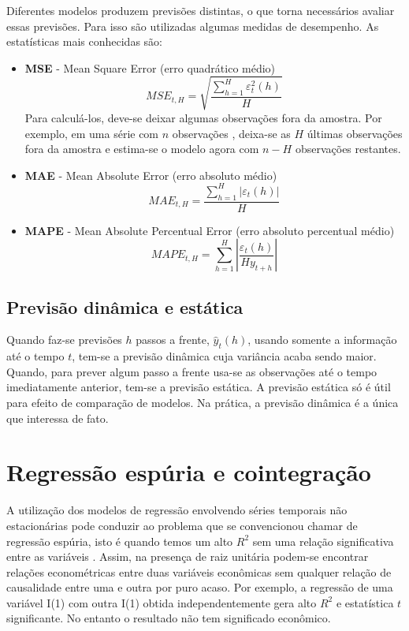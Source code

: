 \documentclass[
]{book}
\theoremstyle{definition}
\theoremstyle{definition}
\theoremstyle{definition}
\theoremstyle{remark}
\begin{document}
Diferentes modelos produzem previsões distintas, o que torna necessários avaliar essas previsões. Para isso são utilizadas algumas medidas de desempenho. As estatísticas mais conhecidas são:

\begin{itemize}
\item
  \textbf{MSE} - Mean Square Error (erro quadrático médio)
  \[MSE_{t,H}=\sqrt{\frac{\sum_{h=1}^{H}\varepsilon^2_t(h)}{H}}\]
  Para calculá-los, deve-se deixar algumas observações fora da amostra. Por exemplo, em uma série com \(n\) observações , deixa-se as \(H\) últimas observações fora da amostra e estima-se o modelo agora com \(n-H\) observações restantes.
\item
  \textbf{MAE} - Mean Absolute Error (erro absoluto médio)
  \[MAE_{t,H}=\frac{\sum_{h=1}^{H}|\varepsilon_t(h)|}{H}\]
\item
  \textbf{MAPE} - Mean Absolute Percentual Error (erro absoluto percentual médio)
  \[MAPE_{t,H}=\sum_{h=1}^{H}\left|\frac{\varepsilon_t(h)}{Hy_{t+h}}\right|\]
\end{itemize}

\hypertarget{previsuxe3o-dinuxe2mica-e-estuxe1tica}{%
\subsection{Previsão dinâmica e estática}\label{previsuxe3o-dinuxe2mica-e-estuxe1tica}}

Quando faz-se previsões \(h\) passos a frente, \(\hat{y}_t(h)\), usando somente a informação até o tempo \(t\), tem-se a previsão dinâmica cuja variância acaba sendo maior. Quando, para prever algum passo a frente usa-se as observações até o tempo imediatamente anterior, tem-se a previsão estática. A previsão estática só é útil para efeito de comparação de modelos. Na prática, a previsão dinâmica é a única que interessa de fato.

\pagebreak

\hypertarget{regressuxe3o-espuxfaria-e-cointegrauxe7uxe3o}{%
\section{Regressão espúria e cointegração}\label{regressuxe3o-espuxfaria-e-cointegrauxe7uxe3o}}

A utilização dos modelos de regressão envolvendo séries temporais não estacionárias pode conduzir ao problema que se convencionou chamar de regressão espúria, isto é quando temos um alto \(R^2\) sem uma relação significativa entre as variáveis \citep{harris1995}. Assim, na presença de raiz unitária podem-se encontrar relações econométricas entre duas variáveis econômicas sem qualquer relação de causalidade entre uma e outra por puro acaso. Por exemplo, a regressão de uma variável I(1) com outra I(1) obtida independentemente gera alto \(R^2\) e estatística \(t\) significante. No entanto o resultado não tem significado econômico.
\end{document}
